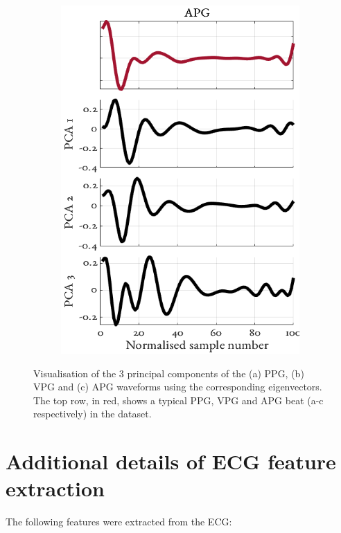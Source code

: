 \documentclass[fleqn,10pt]{wlscirep}
\begin{document}
\begin{figure}[h]
\begin{subfigure}{.3\textwidth}
		\includegraphics[width = \linewidth]{PCA_component_eigenvectors_APG.png}
		\caption{}
	\end{subfigure}
	\caption{Visualisation of the 3 principal components of the (a) PPG, (b) VPG and (c) APG waveforms using the corresponding eigenvectors. The top row, in red, shows a typical PPG, VPG and APG beat (a-c respectively) in the dataset.}
	\label{fig:PCA}
\end{figure}

\section{Additional details of ECG feature extraction}
\label{sec:ECG_feats_supp}

The following features were extracted from the ECG:
\end{document}
